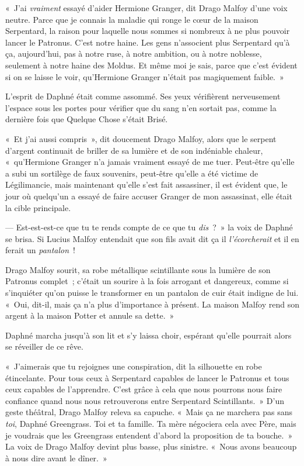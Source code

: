 «~J'ai \emph{vraiment} essayé d'aider Hermione Granger, dit Drago Malfoy d'une voix neutre. Parce que je connais la maladie qui ronge le cœur de la maison Serpentard, la raison pour laquelle nous sommes si nombreux à ne plus pouvoir lancer le Patronus. C'est notre haine. Les gens n'associent plus Serpentard qu'à ça, aujourd'hui, pas à notre ruse, à notre ambition, ou à notre noblesse, seulement à notre haine des Moldus. Et même moi je sais, parce que c'est évident si on se laisse le voir, qu'Hermione Granger n'était pas magiquement faible.~»

L'esprit de Daphné était comme assommé. Ses yeux vérifièrent nerveusement l'espace sous les portes pour vérifier que du sang n'en sortait pas, comme la dernière fois que Quelque Chose s'était Brisé.

«~Et j'ai aussi compris~», dit doucement Drago Malfoy, alors que le serpent d'argent continuait de briller de sa lumière et de son indéniable chaleur, «~qu'Hermione Granger n'a jamais vraiment essayé de me tuer. Peut-être qu'elle a subi un sortilège de faux souvenirs, peut-être qu'elle a été victime de Légilimancie, mais maintenant qu'elle s'est fait assassiner, il est évident que, le jour où quelqu'un a essayé de faire accuser Granger de mon assassinat, elle était la cible principale.

--- Est-est-est-ce que tu te rends compte de ce que tu \emph{dis}~?~» la voix de Daphné se brisa. Si Lucius Malfoy entendait que son fils avait dit ça il \emph{l'écorcherait} et il en ferait un \emph{pantalon}~!

Drago Malfoy sourit, sa robe métallique scintillante sous la lumière de son Patronus complet~; c'était un sourire à la fois arrogant et dangereux, comme si s'inquiéter qu'on puisse le transformer en un pantalon de cuir était indigne de lui. «~Oui, dit-il, mais ça n'a plus d'importance à présent. La maison Malfoy rend son argent à la maison Potter et annule sa dette.~»

Daphné marcha jusqu'à son lit et s'y laissa choir, espérant qu'elle pourrait alors se réveiller de ce rêve.

«~J'aimerais que tu rejoignes une conspiration, dit la silhouette en robe étincelante. Pour tous ceux à Serpentard capables de lancer le Patronus et tous ceux capables de l'apprendre. C'est grâce à cela que nous pourrons nous faire confiance quand nous nous retrouverons entre Serpentard Scintillants.~» D'un geste théâtral, Drago Malfoy releva sa capuche. «~Mais ça ne marchera pas sans \emph{toi}, Daphné Greengrass. Toi et ta famille. Ta mère négociera cela avec Père, mais je voudrais que les Greengrass entendent d'abord la proposition de ta bouche.~» La voix de Drago Malfoy devint plus basse, plus sinistre. «~Nous avons beaucoup à nous dire avant le dîner.~»

